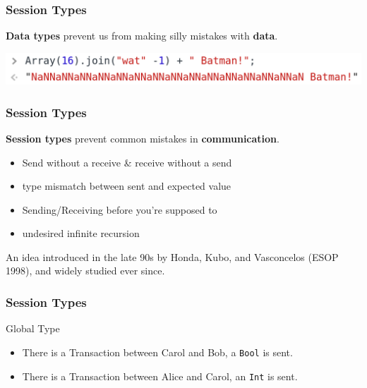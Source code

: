 \documentclass[12pt]{beamer}
\begin{document}
\begin{frame}[t]
\frametitle{Session Types}

\begin{center}
    \textbf{Data types} prevent us from making silly mistakes with \textbf{data}. \linebreak 

\begin{center}
\includegraphics[scale=0.30]{img/batman.png}
\end{center}

\end{center}




\end{frame}

\begin{frame}[t]
\frametitle{Session Types}
    \textbf{Session types} prevent common mistakes in \textbf{communication}.  

\begin{itemize}
    \item Send without a receive \& receive without a send
    \item type mismatch between sent and expected value
    \item Sending/Receiving before you're supposed to
    \item undesired infinite recursion
\end{itemize}

An idea introduced in the late 90s by Honda, Kubo, and Vasconcelos (ESOP 1998), and widely studied ever since. 

\end{frame}

\begin{frame}[t]
\frametitle{Session Types}

Global Type

\begin{itemize}
    \item There is a Transaction between Carol and Bob, a \texttt{Bool} is sent.
    \item There is a Transaction between Alice and Carol, an \texttt{Int} is sent.
\end{itemize}

\end{frame}
\end{document}
